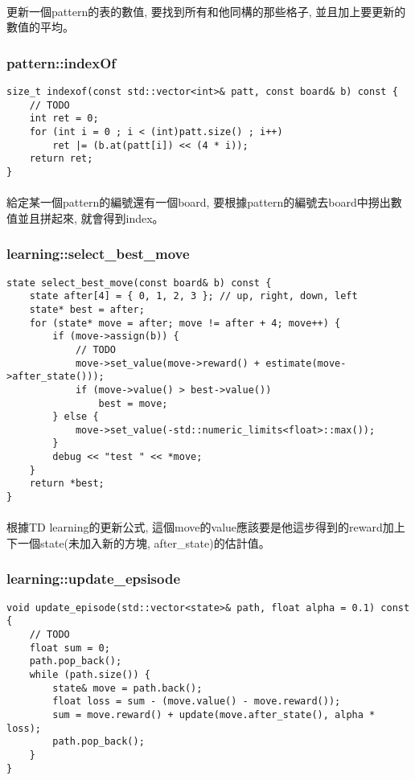 \paragraph{}
更新一個pattern的表的數值, 要找到所有和他同構的那些格子, 並且加上要更新的數值的平均。
\subsubsection{pattern::indexOf}
\begin{lstlisting}
size_t indexof(const std::vector<int>& patt, const board& b) const {
    // TODO
    int ret = 0;
    for (int i = 0 ; i < (int)patt.size() ; i++)
        ret |= (b.at(patt[i]) << (4 * i));
    return ret;
}
\end{lstlisting}
\paragraph{}
給定某一個pattern的編號還有一個board, 要根據pattern的編號去board中撈出數值並且拼起來, 就會得到index。
\subsubsection{learning::select\_best\_move}
\begin{lstlisting}
state select_best_move(const board& b) const {
    state after[4] = { 0, 1, 2, 3 }; // up, right, down, left
    state* best = after;
    for (state* move = after; move != after + 4; move++) {
        if (move->assign(b)) {
            // TODO
            move->set_value(move->reward() + estimate(move->after_state()));
            if (move->value() > best->value())
                best = move;
        } else {
            move->set_value(-std::numeric_limits<float>::max());
        }
        debug << "test " << *move;
    }
    return *best;
}
\end{lstlisting}
\paragraph{}
根據TD learning的更新公式, 這個move的value應該要是他這步得到的reward加上下一個state(未加入新的方塊, after\_state)的估計值。
\subsubsection{learning::update\_epsisode}
\begin{lstlisting}
void update_episode(std::vector<state>& path, float alpha = 0.1) const {
    // TODO
    float sum = 0;
    path.pop_back();
    while (path.size()) {
        state& move = path.back();
        float loss = sum - (move.value() - move.reward());
        sum = move.reward() + update(move.after_state(), alpha * loss);
        path.pop_back();
    }
}
\end{lstlisting}
